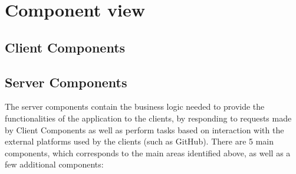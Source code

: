 \section{Component view}
\begin{adjustbox}{
        max size={\textwidth}{},
        caption={Component view diagram},
        label={fig:Component view diagram},
        figure=H}
    \centering
\end{adjustbox}

\subsection{Client Components}

\subsection{Server Components}
The server components contain the business logic needed to provide the functionalities of the application to the clients,
by responding to requests made by Client Components as well as perform tasks based on interaction with the external
platforms used by the clients (such as GitHub). There are 5 main components, which corresponds to the main areas identified
above, as well as a few additional components:
